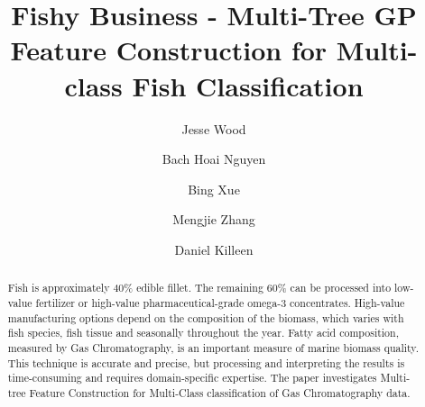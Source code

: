 \documentclass[runningheads]{llncs}
\begin{document}
%
\title{Fishy Business - Multi-Tree GP Feature Construction for Multi-class Fish Classification}
%

\author{Jesse Wood \and
  Bach Hoai Nguyen \and
  Bing Xue \and 
  Mengjie Zhang \and 
  Daniel Killeen
}
%


%
\maketitle              %
%
\begin{abstract}
  
  Fish is approximately 40\% edible fillet. 
  The remaining 60\% can be processed into low-value fertilizer or high-value pharmaceutical-grade omega-3 concentrates.
  High-value manufacturing options depend on the composition of the biomass, which varies with fish species, fish tissue and seasonally throughout the year.
  Fatty acid composition, measured by Gas Chromatography, is an important measure of marine biomass quality.
  This technique is accurate and precise, but processing and interpreting the results is time-consuming and requires domain-specific expertise.
  The paper investigates Multi-tree Feature Construction for Multi-Class classification of Gas Chromatography data.
  
\end{abstract}
\end{document}
